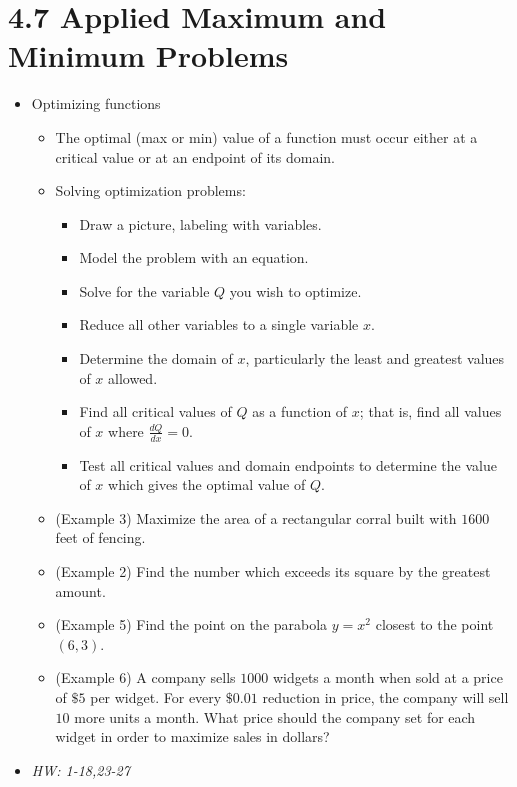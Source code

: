 \documentclass[11pt]{article}
\begin{document}
\section*{4.7 Applied Maximum and Minimum Problems}

\begin{itemize}
\item Optimizing functions
  \begin{itemize}
    \item The optimal (max or min) value of a function must occur either
          at a critical value or at an endpoint of its domain.
    \item Solving optimization problems:
      \begin{itemize}
        \item Draw a picture, labeling with variables.
        \item Model the problem with an equation.
        \item Solve for the variable \(Q\) you wish to optimize.
        \item Reduce all other variables to a single variable \(x\).
        \item Determine the domain of \(x\), particularly the least and
              greatest values of \(x\) allowed.
        \item Find all critical values of \(Q\) as a function of \(x\);
              that is, find all values of \(x\) where \(\frac{dQ}{dx}=0\).
        \item Test all critical values and domain endpoints to determine
              the value of \(x\) which gives the optimal value of \(Q\).
      \end{itemize}
    \item (Example 3) Maximize the area of a rectangular corral built with
          \(1600\) feet of fencing.
    \item (Example 2) Find the number which exceeds its square by the greatest
          amount.
    \item (Example 5) Find the point on the parabola \(y=x^2\) closest to
          the point \((6,3)\).
    \item (Example 6) A company sells \(1000\) widgets a month when sold at
          a price of \(\$5\) per widget. For every \(\$0.01\) reduction in
          price, the company will sell \(10\) more units a month. What price
          should the company set for each widget in order to maximize sales
          in dollars?
  \end{itemize}
\item\textit{
  HW: 1-18,23-27
}
\end{itemize}
\end{document}
